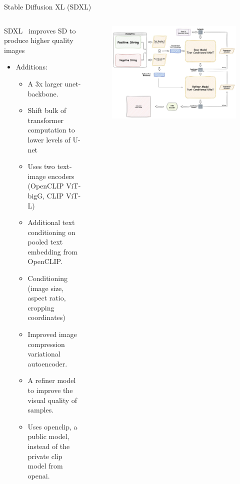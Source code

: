 \documentclass[8pt]{beamer}
\begin{document}
\begin{frame}{Stable Diffusion XL (SDXL)}
    \begin{columns}
        \begin{column}{.5\textwidth}
            \fontsize{6pt}{8pt}\selectfont
            SDXL~\cite{podell2023sdxl} improves SD to produce higher quality images
            \begin{itemize}
                \item Additions:
                \begin{itemize}
                    \fontsize{6pt}{8pt}\selectfont
                    \item A 3x larger unet-backbone.
                    \item Shift bulk of transformer computation to lower levels of U-net
                    \item Uses two text-image encoders (OpenCLIP ViT-bigG, CLIP ViT-L)
                    \item Additional text conditioning on pooled text embedding from OpenCLIP.
                    \item Conditioning (image size, aspect ratio, cropping coordinates)
                    \item Improved image compression variational autoencoder.
                    \item A refiner model to improve the visual quality of samples.
                    \item Uses openclip, a public model, instead of the private clip model from openai.
                \end{itemize}
            \end{itemize}
        \end{column}
        \begin{column}{.5\textwidth}
           \begin{figure}
               \includegraphics[scale=0.1]{images/sdxl_architecture}
               \label{fig:sdxl_architecture}
           \end{figure}~\cite{demir}
        \end{column}
    \end{columns}
\end{frame}
\end{document}
